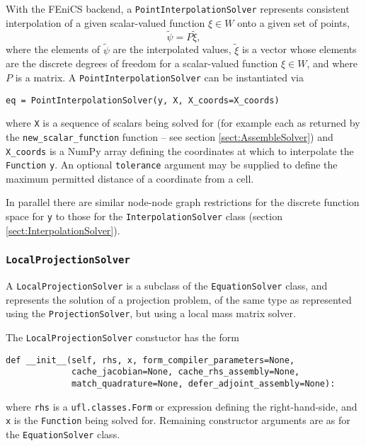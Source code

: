 \documentclass[11pt]{article}
\begin{document}
With the FEniCS backend, a \texttt{PointInterpolationSolver} represents
consistent interpolation of a given scalar-valued function $\xi \in W$ onto a
given set of points,
\begin{equation*}
  \tilde{\psi} = P \tilde{\xi},
\end{equation*}
where the elements of $\tilde{\psi}$ are the interpolated values, $\tilde{\xi}$
is a vector whose elements are the discrete degrees of freedom for a
scalar-valued function $\xi \in W$, and where $P$ is a matrix. A
\texttt{PointInterpolationSolver} can be instantiated via
\begin{lstlisting}
eq = PointInterpolationSolver(y, X, X_coords=X_coords)
\end{lstlisting}
where \texttt{X} is a sequence of scalars being solved for (for example each as
returned by the \texttt{new\_scalar\_function} function -- see section
\ref{sect:AssembleSolver}) and \texttt{X\_coords} is a NumPy array defining the
coordinates at which to interpolate the \texttt{Function} \texttt{y}. An
optional \texttt{tolerance} argument may be supplied to define the maximum
permitted distance of a coordinate from a cell.

In parallel there are similar node-node graph restrictions for the discrete
function space for \texttt{y} to those for the \texttt{InterpolationSolver}
class (section \ref{sect:InterpolationSolver}).

\subsubsection{\texttt{LocalProjectionSolver}}

A \texttt{LocalProjectionSolver} is a subclass of the \texttt{EquationSolver}
class, and represents the solution of a projection problem, of the same type as
represented using the \texttt{ProjectionSolver}, but using a local mass matrix
solver.

The \texttt{LocalProjectionSolver} constuctor has the form
\begin{lstlisting}
def __init__(self, rhs, x, form_compiler_parameters=None,
             cache_jacobian=None, cache_rhs_assembly=None,
             match_quadrature=None, defer_adjoint_assembly=None):
\end{lstlisting}
where \texttt{rhs} is a \texttt{ufl.classes.Form} or expression defining the
right-hand-side, and \texttt{x} is the \texttt{Function} being solved for.
Remaining constructor arguments are as for the \texttt{EquationSolver} class.
\end{document}
